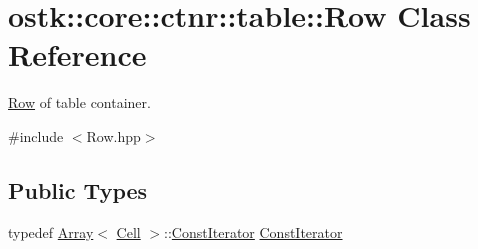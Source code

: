 \hypertarget{classostk_1_1core_1_1ctnr_1_1table_1_1_row}{}\section{ostk\+:\+:core\+:\+:ctnr\+:\+:table\+:\+:Row Class Reference}
\label{classostk_1_1core_1_1ctnr_1_1table_1_1_row}


\hyperlink{classostk_1_1core_1_1ctnr_1_1table_1_1_row}{Row} of table container.  




{\ttfamily \#include $<$Row.\+hpp$>$}

\subsection*{Public Types}
\begin{DoxyCompactItemize}
\item 
typedef \hyperlink{classostk_1_1core_1_1ctnr_1_1_array}{Array}$<$ \hyperlink{namespaceostk_1_1core_1_1ctnr_1_1table_a697fb8eda17fde15703741a0c49036b9}{Cell} $>$\+::\hyperlink{classostk_1_1core_1_1ctnr_1_1table_1_1_row_af1eb8276a850652cbeb4ee3575aa7db3}{Const\+Iterator} \hyperlink{classostk_1_1core_1_1ctnr_1_1table_1_1_row_af1eb8276a850652cbeb4ee3575aa7db3}{Const\+Iterator}
\end{DoxyCompactItemize}
